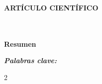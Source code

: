 \documentclass[10pt,a4paper]{extarticle}
\begin{document}
\fontsize{10.4}{12.4}\selectfont

\begin{center}
  {\fontsize{8.5}{10.5}\selectfont\bfseries ARTÍCULO CIENTÍFICO}\\[4pt]
  {\fontsize{14}{16.5}\selectfont\bfseries \Titulo}\\[6pt]
  {\fontsize{11}{13}\selectfont \AutorA{}}\\[2pt]
  {\fontsize{9.5}{11.5}\selectfont\itshape \Filiacion}
\end{center}

\vspace{2pt}
{\fontsize{9.5}{11.5}\selectfont
\noindent\textbf{Resumen}\par
\noindent \Resumen\par
\vspace{2pt}
\noindent\textbf{\textit{Palabras clave:}} \PalabrasClave\par
}
\vspace{4pt}

\begin{multicols}{2}





\end{multicols}

\printbibliography[title={Referencias}]
\end{document}
